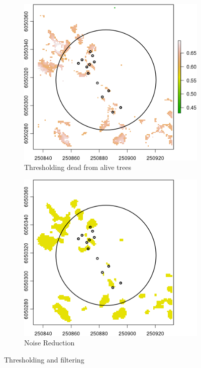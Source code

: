 \documentclass{subfiles}
\begin{document}
  \begin{figure} [h!]			
  	\begin{subfigure}[t]{.49\textwidth}
  		
  		\centering
  		\includegraphics[width=\textwidth]{img/dead/c8_thresDead}
  		\caption{Thresholding dead from alive trees}
  		\label{fig:c8_deadThres}
  	\end{subfigure} \hfill
  	\begin{subfigure}[t]{.49\textwidth}
  		\centering
  		\includegraphics[width=\textwidth]{img/dead/c9_sharpFilter}
  		\caption{Noise Reduction} 
  		\label{fig:c9_sharpFilter}
  	\end{subfigure} \hfill
  \caption{Thresholding and filtering }  
  \label{fig:dt_sf} 
  \end{figure}
  
\end{document}
